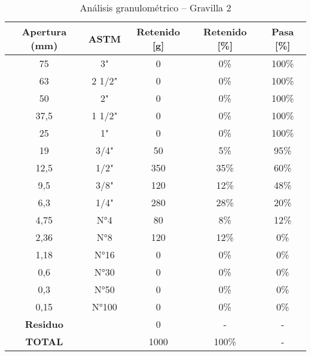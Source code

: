 \begin{table}[H]
\centering
\caption{Análisis granulométrico – Gravilla 2}
\label{tab:gravilla2}
\small
\begin{tabular}{|c|c|c|c|c|}
\hline
\textbf{Apertura (mm)} & \textbf{ASTM} & \textbf{Retenido [g]} & \textbf{Retenido [\%]} & \textbf{Pasa [\%]} \\ \hline
75   & 3"      & 0   & 0\%  & 100\% \\ \hline
63   & 2 1/2"  & 0   & 0\%  & 100\% \\ \hline
50   & 2"      & 0   & 0\%  & 100\% \\ \hline
37,5 & 1 1/2"  & 0   & 0\%  & 100\% \\ \hline
25   & 1"      & 0   & 0\%  & 100\% \\ \hline
19   & 3/4"    & 50  & 5\%  & 95\%  \\ \hline
12,5 & 1/2"    & 350 & 35\% & 60\%  \\ \hline
9,5  & 3/8"    & 120 & 12\% & 48\%  \\ \hline
6,3  & 1/4"    & 280 & 28\% & 20\%  \\ \hline
4,75 & N°4     & 80  & 8\%  & 12\%  \\ \hline
2,36 & N°8     & 120 & 12\% & 0\%   \\ \hline
1,18 & N°16    & 0   & 0\%  & 0\%   \\ \hline
0,6  & N°30    & 0   & 0\%  & 0\%   \\ \hline
0,3  & N°50    & 0   & 0\%  & 0\%   \\ \hline
0,15 & N°100   & 0   & 0\%  & 0\%   \\ \hline
\textbf{Residuo} &     & 0   & -    & -     \\ \hline
\textbf{TOTAL}  &     & 1000& 100\%& -     \\ \hline
\end{tabular}
\end{table}

